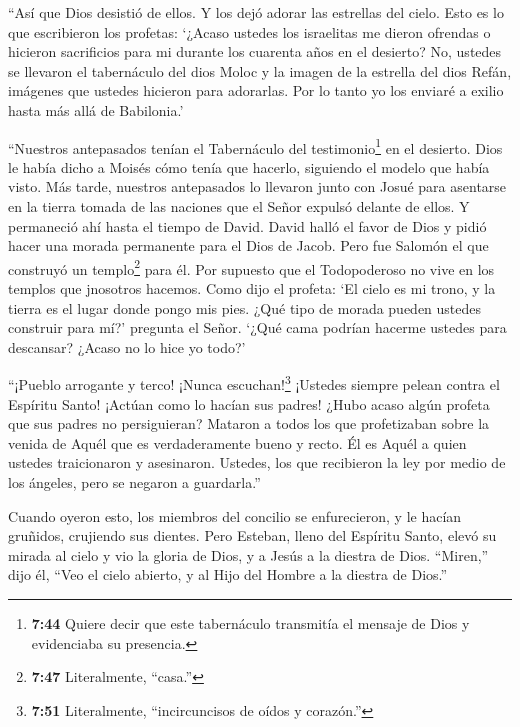  ``Así que Dios desistió de ellos. Y los dejó adorar las
estrellas del cielo. Esto es lo que escribieron los profetas: `¿Acaso
ustedes los israelitas me dieron ofrendas o hicieron sacrificios para mi
durante los cuarenta años en el desierto?  No, ustedes se
llevaron el tabernáculo del dios Moloc y la imagen de la estrella del
dios Refán, imágenes que ustedes hicieron para adorarlas. Por lo tanto
yo los enviaré a exilio hasta más allá de Babilonia.'

 ``Nuestros antepasados tenían el Tabernáculo del
testimonio\footnote{\textbf{7:44} Quiere decir que este tabernáculo
  transmitía el mensaje de Dios y evidenciaba su presencia.} en el
desierto. Dios le había dicho a Moisés cómo tenía que hacerlo, siguiendo
el modelo que había visto.  Más tarde, nuestros antepasados
lo llevaron junto con Josué para asentarse en la tierra tomada de las
naciones que el Señor expulsó delante de ellos. Y permaneció ahí hasta
el tiempo de David.  David halló el favor de Dios y pidió
hacer una morada permanente para el Dios de Jacob.  Pero
fue Salomón el que construyó un templo\footnote{\textbf{7:47}
  Literalmente, ``casa.''} para él.  Por supuesto que el
Todopoderoso no vive en los templos que jnosotros hacemos. Como dijo el
profeta:  `El cielo es mi trono, y la tierra es el lugar
donde pongo mis pies. ¿Qué tipo de morada pueden ustedes construir para
mí?' pregunta el Señor. `¿Qué cama podrían hacerme ustedes para
descansar?  ¿Acaso no lo hice yo todo?'

 ``¡Pueblo arrogante y terco! ¡Nunca escuchan!\footnote{\textbf{7:51}
  Literalmente, ``incircuncisos de oídos y corazón.''} ¡Ustedes siempre
pelean contra el Espíritu Santo! ¡Actúan como lo hacían sus padres!
 ¿Hubo acaso algún profeta que sus padres no persiguieran?
Mataron a todos los que profetizaban sobre la venida de Aquél que es
verdaderamente bueno y recto. Él es Aquél a quien ustedes traicionaron y
asesinaron.  Ustedes, los que recibieron la ley por medio
de los ángeles, pero se negaron a guardarla.''

 Cuando oyeron esto, los miembros del concilio se
enfurecieron, y le hacían gruñidos, crujiendo sus dientes. 
Pero Esteban, lleno del Espíritu Santo, elevó su mirada al cielo y vio
la gloria de Dios, y a Jesús a la diestra de Dios. 
``Miren,'' dijo él, ``Veo el cielo abierto, y al Hijo del Hombre a la
diestra de Dios.''

